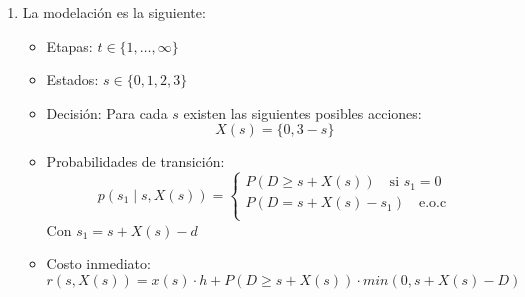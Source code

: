 \documentclass[letterpaper,10pt]{article}
\begin{document}
\begin{enumerate}
    \item La modelación es la siguiente:
    \begin{itemize}
        \item Etapas: $t \in \{1, \dots, \infty \}$
        \item Estados: $s \in \{0, 1, 2, 3\}$
        \item Decisión: Para cada $s$ existen las siguientes posibles acciones: $$X(s) = \{0, 3 - s\}$$
        \item Probabilidades de transición:
            \[
            p(s_1\mid s, X(s)) =
                 \begin{cases}
                    P(D\geq s+X(s)) \quad \text{si $s_1 = 0$}\\
                    P(D=s+X(s)-s_1) \quad\text{e.o.c}\\
                 \end{cases}
            \]
            Con $s_1 = s+X(s)-d$
        \item Costo inmediato:
            $$r(s, X(s)) = x(s)\cdot h + P(D\geq s + X(s)) \cdot min(0, s+X(s)-D)$$
    \end{itemize}
\end{enumerate}


  
\end{document}

